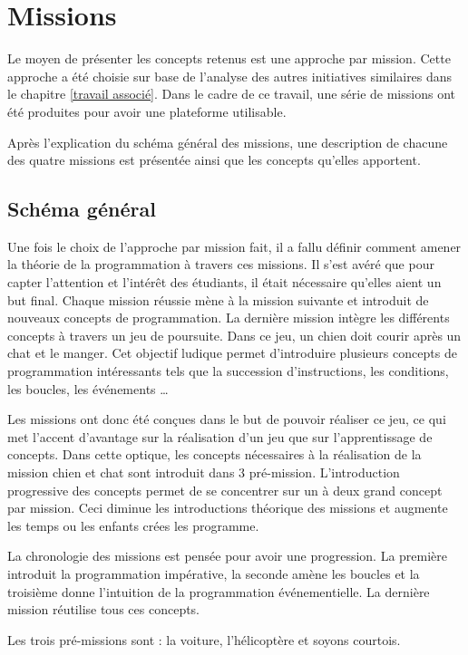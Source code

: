 \section{Missions}
\label{missions}
Le moyen de présenter les concepts retenus est une approche par mission. Cette approche a été choisie sur base de l'analyse des autres initiatives similaires dans le chapitre \ref{travail associé}. Dans le cadre de ce travail, une série de missions ont été produites pour avoir une plateforme utilisable.

Après l'explication du schéma général des missions, une description de chacune des quatre missions est présentée ainsi que les concepts qu'elles apportent.

\subsection{Schéma général}
Une fois le choix de l'approche par mission fait, il a fallu définir comment amener la théorie de la programmation à travers ces missions. Il s'est avéré que pour capter l'attention et l'intérêt des étudiants, il était nécessaire qu'elles aient un but final. Chaque mission réussie mène à la mission suivante et introduit de nouveaux concepts de programmation. La dernière mission intègre les différents concepts à travers un jeu de poursuite. Dans ce jeu, un chien doit courir après un chat et le manger. Cet objectif ludique permet d'introduire plusieurs concepts de programmation intéressants tels que la succession d'instructions, les conditions, les boucles, les événements \ldots

Les missions ont donc été conçues dans le but de pouvoir réaliser ce jeu, ce qui met l'accent d'avantage sur la réalisation d'un jeu que sur l'apprentissage de concepts. Dans cette optique, les concepts nécessaires à la réalisation de la mission chien et chat sont introduit dans 3 pré-mission. L'introduction progressive des concepts permet de se concentrer sur un à deux grand concept par mission. Ceci diminue les introductions théorique des missions et augmente les temps ou les enfants crées les programme.

La chronologie des missions est pensée pour avoir une progression. La première introduit la programmation impérative, la seconde amène les boucles et la troisième donne l'intuition de la programmation événementielle. La dernière mission réutilise tous ces concepts.

Les trois pré-missions sont : la voiture, l'hélicoptère et soyons courtois.


